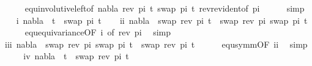 \begin{isabellebody}
\ \ \ \ \isamarkupfalse%
\ equ{\isacharunderscore}{\kern0pt}involutive{\isacharunderscore}{\kern0pt}left{\isacharbrackleft}{\kern0pt}of\ nabla\ {\isacartoucheopen}rev\ pi{\isacartoucheclose}\ t{}\ {\isacartoucheopen}swap\ pi\ t{}{\isacartoucheclose}{\isacharbrackright}{\kern0pt}\ rev{\isacharunderscore}{\kern0pt}rev{\isacharunderscore}{\kern0pt}ident{\isacharbrackleft}{\kern0pt}of\ pi{\isacharbrackright}{\kern0pt}\isanewline
\ \ \ \ \isamarkupfalse%
\ simp\isakeywordONE{{\isacharbraceright}{\kern0pt}}\isamarkupfalse%
\isanewline
\isanewline
\ \ \isakeywordONE{{\isacharbraceleft}{\kern0pt}}\isamarkupfalse%
\isamarkupfalse%
\ i{\isacharcolon}{\kern0pt}\ {\isachardoublequoteopen}nabla\ {\isasymturnstile}\ t{}\ {\isasymapprox}\ swap\ pi\ t{}{\isachardoublequoteclose}\isanewline
\ \ \isamarkupfalse%
\ ii{\isacharcolon}{\kern0pt}\ {\isachardoublequoteopen}nabla\ {\isasymturnstile}\ swap\ {\isacharparenleft}{\kern0pt}rev\ pi{\isacharparenright}{\kern0pt}\ t{}\ {\isasymapprox}\ swap\ {\isacharparenleft}{\kern0pt}rev\ pi{\isacharparenright}{\kern0pt}\ {\isacharparenleft}{\kern0pt}swap\ pi\ t{}{\isacharparenright}{\kern0pt}{\isachardoublequoteclose}\isanewline
\ \ \ \ \isamarkupfalse%
\ equ{\isacharunderscore}{\kern0pt}equivariance{\isacharbrackleft}{\kern0pt}OF\ i{\isacharcomma}{\kern0pt}\ of\ {\isacartoucheopen}rev\ pi{\isacartoucheclose}{\isacharbrackright}{\kern0pt}\ \isamarkupfalse%
\ simp\isanewline
\ \ \isamarkupfalse%
\ \isamarkupfalse%
\ iii{\isacharcolon}{\kern0pt}\ {\isachardoublequoteopen}nabla\ {\isasymturnstile}\ swap\ {\isacharparenleft}{\kern0pt}rev\ pi{\isacharparenright}{\kern0pt}\ {\isacharparenleft}{\kern0pt}swap\ pi\ t{}{\isacharparenright}{\kern0pt}\ {\isasymapprox}\ swap\ {\isacharparenleft}{\kern0pt}rev\ pi{\isacharparenright}{\kern0pt}\ t{}{\isachardoublequoteclose}\isanewline
\ \ \ \ \isamarkupfalse%
\ equ{\isacharunderscore}{\kern0pt}symm{\isacharbrackleft}{\kern0pt}OF\ ii{\isacharbrackright}{\kern0pt}\ \isamarkupfalse%
\ simp\isanewline
\ \ \isamarkupfalse%
\ \isamarkupfalse%
\ iv{\isacharcolon}{\kern0pt}\ {\isachardoublequoteopen}nabla\ {\isasymturnstile}\ t{}\ {\isasymapprox}\ swap\ {\isacharparenleft}{\kern0pt}rev\ pi{\isacharparenright}{\kern0pt}\ t{}{\isachardoublequoteclose}\isanewline

\end{isabellebody}
